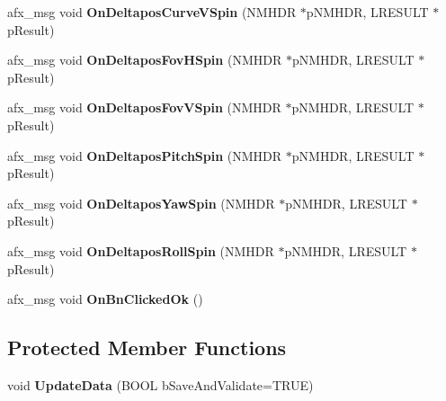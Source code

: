 \begin{DoxyCompactItemize}
\mbox{\label{class_fec_tool_a2a65a052c43c27968a6ef6eb93d7095d}} 
afx\+\_\+msg void {\bfseries On\+Deltapos\+Curve\+V\+Spin} (N\+M\+H\+DR $\ast$p\+N\+M\+H\+DR, L\+R\+E\+S\+U\+LT $\ast$p\+Result)
\item 
\mbox{\label{class_fec_tool_af2aa98a5d986106082994ffe5dfa8219}} 
afx\+\_\+msg void {\bfseries On\+Deltapos\+Fov\+H\+Spin} (N\+M\+H\+DR $\ast$p\+N\+M\+H\+DR, L\+R\+E\+S\+U\+LT $\ast$p\+Result)
\item 
\mbox{\label{class_fec_tool_a27a6d44bc322df9abfa6a4dab93e796f}} 
afx\+\_\+msg void {\bfseries On\+Deltapos\+Fov\+V\+Spin} (N\+M\+H\+DR $\ast$p\+N\+M\+H\+DR, L\+R\+E\+S\+U\+LT $\ast$p\+Result)
\item 
\mbox{\label{class_fec_tool_a7cfdea1e3f18cc09d96c8f70856fefa6}} 
afx\+\_\+msg void {\bfseries On\+Deltapos\+Pitch\+Spin} (N\+M\+H\+DR $\ast$p\+N\+M\+H\+DR, L\+R\+E\+S\+U\+LT $\ast$p\+Result)
\item 
\mbox{\label{class_fec_tool_a32e53997d8fa0670b379e56fd3f5d869}} 
afx\+\_\+msg void {\bfseries On\+Deltapos\+Yaw\+Spin} (N\+M\+H\+DR $\ast$p\+N\+M\+H\+DR, L\+R\+E\+S\+U\+LT $\ast$p\+Result)
\item 
\mbox{\label{class_fec_tool_af6793729b332372e36e7cfc3f0ccbedf}} 
afx\+\_\+msg void {\bfseries On\+Deltapos\+Roll\+Spin} (N\+M\+H\+DR $\ast$p\+N\+M\+H\+DR, L\+R\+E\+S\+U\+LT $\ast$p\+Result)
\item 
\mbox{\label{class_fec_tool_ac257463f34fc4bc4bf2a49c9c5ad3253}} 
afx\+\_\+msg void {\bfseries On\+Bn\+Clicked\+Ok} ()
\end{DoxyCompactItemize}
\subsection*{Protected Member Functions}
\begin{DoxyCompactItemize}
\item 
\mbox{\label{class_fec_tool_a206c20426c1448c7fa2a1cb9081dbb93}} 
void {\bfseries Update\+Data} (B\+O\+OL b\+Save\+And\+Validate=T\+R\+UE)
\end{DoxyCompactItemize}
